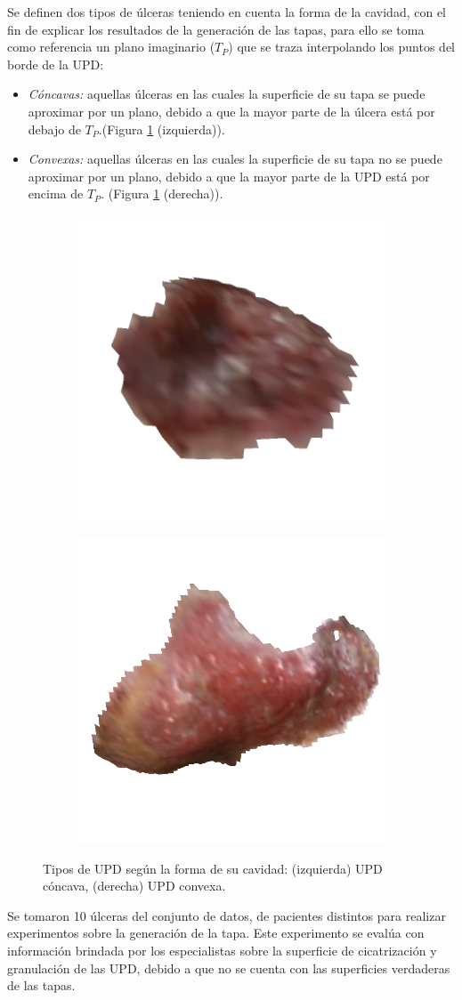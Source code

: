 Se definen dos tipos de úlceras teniendo en cuenta la forma de la cavidad, con el fin de explicar los resultados de la generación de las tapas, para ello se toma como referencia un plano imaginario ($T_P$) que se traza interpolando los puntos del borde de la UPD:

\begin{itemize}
	\item \textit{Cóncavas:} aquellas úlceras en las cuales la superficie de su tapa se puede aproximar por un plano, debido a que la mayor parte de la úlcera está por debajo de $T_P$.(Figura \ref{fig:planar} (izquierda)).
	\item \textit{Convexas:} aquellas úlceras en las cuales la superficie de su tapa no se puede aproximar por un plano, debido a que la mayor parte de la UPD está por encima de $T_P$. (Figura \ref{fig:planar} (derecha)).
\end{itemize}

\begin{figure}[ht]
	\centering
	\begin{subfigure}
		\centering
		\includegraphics[width=.25\linewidth]{./Graphics/planar.png}
	\end{subfigure}
	\begin{subfigure}
		\centering
		\includegraphics[width=.25\linewidth]{./Graphics/noPlanar.png}
	\end{subfigure}
	\caption{Tipos de UPD según la forma de su cavidad: (izquierda) UPD cóncava, (derecha) UPD convexa.}
	\label{fig:planar}
\end{figure}

Se tomaron 10 úlceras del conjunto de datos, de pacientes distintos para realizar experimentos sobre la generación de la tapa. Este experimento se evalúa con información brindada por los especialistas sobre la superficie de cicatrización y granulación de las UPD, debido a que no se cuenta con las superficies verdaderas de las tapas.

